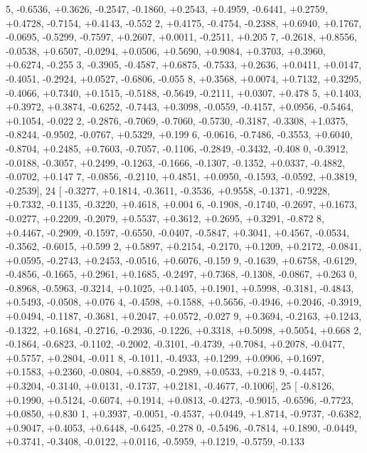 \begin{DoxyCode}
      5, -0.6536, +0.3626, -0.2547, -0.1860, +0.2543, +0.4959, -0.6441, +0.2759, +0.4728, -0.7154, +0.4143, -0.552
      2, +0.4175, -0.4754, -0.2388, +0.6940, +0.1767, -0.0695, -0.5299, -0.7597, +0.2607, +0.0011, -0.2511, +0.205
      7, -0.2618, +0.8556, -0.0538, +0.6507, -0.0294, +0.0506, +0.5690, +0.9084, +0.3703, +0.3960, +0.6274, -0.255
      3, -0.3905, -0.4587, +0.6875, -0.7533, +0.2636, +0.0411, +0.0147, -0.4051, -0.2924, +0.0527, -0.6806, -0.055
      8, +0.3568, +0.0074, +0.7132, +0.3295, -0.4066, +0.7340, +0.1515, -0.5188, -0.5649, -0.2111, +0.0307, +0.478
      5, +0.1403, +0.3972, +0.3874, -0.6252, -0.7443, +0.3098, -0.0559, -0.4157, +0.0956, -0.5464, +0.1054, -0.022
      2, -0.2876, -0.7069, -0.7060, -0.5730, -0.3187, -0.3308, +1.0375, -0.8244, -0.9502, -0.0767, +0.5329, +0.199
      6, -0.0616, -0.7486, -0.3553, +0.6040, -0.8704, +0.2485, +0.7603, -0.7057, -0.1106, -0.2849, -0.3432, -0.408
      0, -0.3912, -0.0188, -0.3057, +0.2499, -0.1263, -0.1666, -0.1307, -0.1352, +0.0337, -0.4882, -0.0702, +0.147
      7, -0.0856, -0.2110, +0.4851, +0.0950, -0.1593, -0.0592, +0.3819, -0.2539],
24 [ -0.3277, +0.1814, -0.3611, -0.3536, +0.9558, -0.1371, -0.9228, +0.7332, -0.1135, -0.3220, +0.4618, +0.004
      6, -0.1908, -0.1740, -0.2697, +0.1673, -0.0277, +0.2209, -0.2079, +0.5537, +0.3612, +0.2695, +0.3291, -0.872
      8, +0.4467, -0.2909, -0.1597, -0.6550, -0.0407, -0.5847, +0.3041, +0.4567, -0.0534, -0.3562, -0.6015, +0.599
      2, +0.5897, +0.2154, -0.2170, +0.1209, +0.2172, -0.0841, +0.0595, -0.2743, +0.2453, -0.0516, +0.6076, -0.159
      9, -0.1639, +0.6758, -0.6129, -0.4856, -0.1665, +0.2961, +0.1685, -0.2497, +0.7368, -0.1308, -0.0867, +0.263
      0, -0.8968, -0.5963, -0.3214, +0.1025, +0.1405, +0.1901, +0.5998, -0.3181, -0.4843, +0.5493, -0.0508, +0.076
      4, -0.4598, +0.1588, +0.5656, -0.4946, +0.2046, -0.3919, +0.0494, -0.1187, -0.3681, +0.2047, +0.0572, -0.027
      9, +0.3694, -0.2163, +0.1243, -0.1322, +0.1684, -0.2716, -0.2936, -0.1226, +0.3318, +0.5098, +0.5054, +0.668
      2, -0.1864, -0.6823, -0.1102, -0.2002, -0.3101, -0.4739, +0.7084, +0.2078, -0.0477, +0.5757, +0.2804, -0.011
      8, -0.1011, -0.4933, +0.1299, +0.0906, +0.1697, +0.1583, +0.2360, -0.0804, +0.8859, -0.2989, +0.0533, +0.218
      9, -0.4457, +0.3204, -0.3140, +0.0131, -0.1737, +0.2181, -0.4677, -0.1006],
25 [ -0.8126, +0.1990, +0.5124, -0.6074, +0.1914, +0.0813, -0.4273, -0.9015, -0.6596, -0.7723, +0.0850, +0.830
      1, +0.3937, -0.0051, -0.4537, +0.0449, +1.8714, -0.9737, -0.6382, +0.9047, +0.4053, +0.6448, -0.6425, -0.278
      0, -0.5496, -0.7814, +0.1890, -0.0449, +0.3741, -0.3408, -0.0122, +0.0116, -0.5959, +0.1219, -0.5759, -0.133

\end{DoxyCode}
